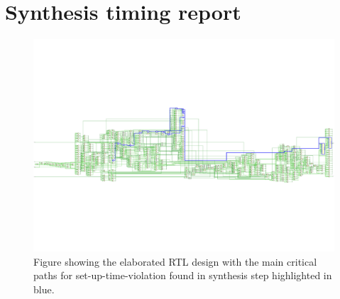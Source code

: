 \section{Synthesis timing report}
\begin{figure}[H]
    \centering
    \includegraphics[width=\textwidth, trim=0 160 0 160, clip]{./images/Vivado/setup_synthesis.pdf}
    \caption{Figure showing the elaborated RTL design with the main critical paths for set-up-time-violation found in synthesis step highlighted in blue.}
    \label{fig:setup_synthesis}
\end{figure}

